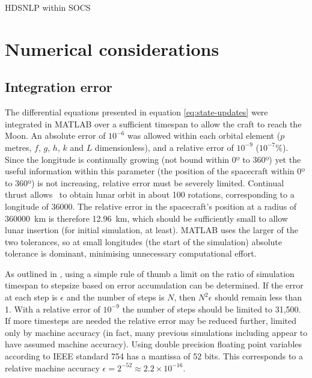 HDSNLP within SOCS



\section{Numerical considerations} \label{sec:Numerical-considerations}


\subsection{Integration error} \label{sub:Integration-error}

The differential equations presented in equation \eqref{eq:state-updates} were integrated in MATLAB over a sufficient timespan to allow the craft to reach the Moon. An absolute error of $10^{-6}$ was allowed within each orbital element ($p$ metres, $f$, $g$, $h$, $k$ and $L$ dimensionless), and a relative error of $10^{-9}$ ($10^{-7}$\%). Since the longitude is continually growing (not bound within 0º to 360º) yet the useful information within this parameter (the position of the spacecraft within 0º to 360º) is not increasing, relative error must be severely limited. Continual thrust allows \BW\ to obtain lunar orbit in about 100 rotations, corresponding to a longitude of 36000\degrees. The relative error in the spacecraft's position at a radius of 360000~km is therefore 12.96~km, which should be sufficiently small to allow lunar insertion (for initial simulation, at least). MATLAB uses the larger of the two tolerances, so at small longitudes (the start of the simulation) absolute tolerance is dominant, minimising unnecessary computational effort.

As outlined in \textcite{Milani1987}, using a simple rule of thumb a limit on the ratio of simulation timespan to stepsize based on error accumulation can be determined. If the error at each step is $\epsilon$ and the number of steps is $N$, then $N^{2}\epsilon$ should remain less than 1. With a relative error of $10^{-9}$ the number of steps should be limited to 31,500. If more timesteps are needed the relative error may be reduced further, limited only by machine accuracy (in fact, many previous simulations including \citeauthor{Milani1987} appear to have assumed machine accuracy). Using double precision floating point variables according to IEEE standard 754 has a mantissa of 52 bits. This corresponds to a relative machine accuracy $\epsilon=2^{-52}\approx2.2\times10^{-16}$.

